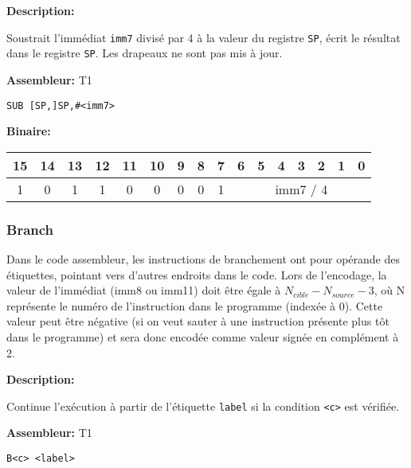 \documentclass{article}
\begin{document}

    \textbf{Description: }

    Soustrait l'immédiat \texttt{imm7} divisé par 4 à la valeur du registre \texttt{SP}, écrit le résultat dans le registre \texttt{SP}.
    Les drapeaux ne sont pas mis à jour.

    \textbf{Assembleur:} T1

    \begin{lstlisting}
SUB [SP,]SP,#<imm7>
    \end{lstlisting}

    \textbf{Binaire:}

    \begin{tabular}{| c c c c c c c c c c c c c c c c |}
        \hline
        15 & 14 & 13 & 12 & \multicolumn{1}{|c}{11} & 10 & 9 & 8 & \multicolumn{1}{|c}{7} & \multicolumn{1}{|c}{6} & 5 & 4 & 3 & 2 & 1 & 0 \\
        \hline
        1 & 0 & 1 & 1 & \multicolumn{1}{|c}{0} & 0 & 0 & 0 & \multicolumn{1}{|c}{1} & \multicolumn{7}{|c|}{imm7 / 4} \\
        \hline
    \end{tabular}

    \subsubsection{Branch}
    \label{subsubsec:Branching}

    Dans le code assembleur, les instructions de branchement ont pour opérande des étiquettes, pointant vers d'autres endroits dans le code. Lors de l'encodage, la valeur de l'immédiat (imm8 ou imm11) doit être égale à $N_{cible} - N_{source} - 3$, où N représente le numéro de l'instruction dans le programme (indexée à 0). Cette valeur peut être négative (si on veut sauter à une instruction présente plus tôt dans le programme) et sera donc encodée comme valeur signée en complément à 2.


    \textbf{Description: }

    Continue l'exécution à partir de l'étiquette \texttt{label} si la condition \texttt{<c>} est vérifiée.

    \textbf{Assembleur:} T1

    \begin{lstlisting}
B<c> <label>
    \end{lstlisting}
\end{document}
